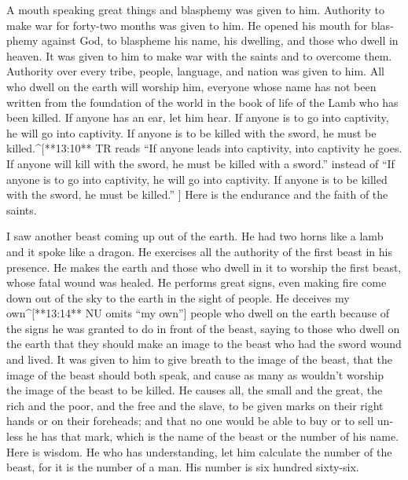 \begin{paracols}{2}
\begin{english}
 A mouth speaking great things and blasphemy was given to him. Authority to make war for forty-two months was given to him.  He opened his mouth for blasphemy against God, to blaspheme his name, his dwelling, and those who dwell in heaven.  It was given to him to make war with the saints and to overcome them. Authority over every tribe, people, language, and nation was given to him.  All who dwell on the earth will worship him, everyone whose name has not been written from the foundation of the world in the book of life of the Lamb who has been killed.  If anyone has an ear, let him hear.  If anyone is to go into captivity, he will go into captivity. If anyone is to be killed with the sword, he must be killed.^[**13:10** TR reads “If anyone leads into captivity, into captivity he goes. If anyone will kill with the sword, he must be killed with a sword.” instead of “If anyone is to go into captivity, he will go into captivity. If anyone is to be killed with the sword, he must be killed.” ] Here is the endurance and the faith of the saints. 

 I saw another beast coming up out of the earth. He had two horns like a lamb and it spoke like a dragon.  He exercises all the authority of the first beast in his presence. He makes the earth and those who dwell in it to worship the first beast, whose fatal wound was healed.  He performs great signs, even making fire come down out of the sky to the earth in the sight of people.  He deceives my own^[**13:14** NU omits “my own”] people who dwell on the earth because of the signs he was granted to do in front of the beast, saying to those who dwell on the earth that they should make an image to the beast who had the sword wound and lived.  It was given to him to give breath to the image of the beast, that the image of the beast should both speak, and cause as many as wouldn’t worship the image of the beast to be killed.  He causes all, the small and the great, the rich and the poor, and the free and the slave, to be given marks on their right hands or on their foreheads;  and that no one would be able to buy or to sell unless he has that mark, which is the name of the beast or the number of his name.  Here is wisdom. He who has understanding, let him calculate the number of the beast, for it is the number of a man. His number is six hundred sixty-six.


\end{english}
\end{paracols}
